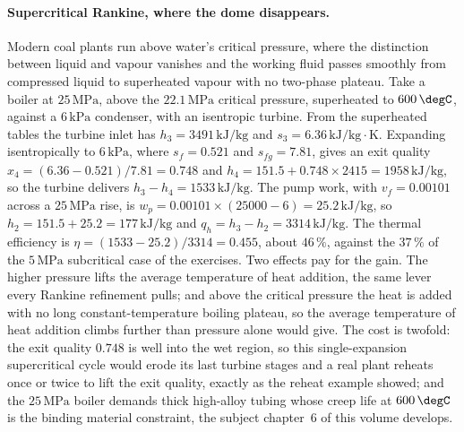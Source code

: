 \paragraph{Supercritical Rankine, where the dome disappears.} Modern coal
plants run above water's critical pressure, where the distinction between liquid
and vapour vanishes and the working fluid passes smoothly from compressed
liquid to superheated vapour with no two-phase plateau. Take a boiler at
$25\,\text{MPa}$, above the $22.1\,\text{MPa}$ critical pressure, superheated to
$600\,\degC$, against a $6\,\text{kPa}$ condenser, with an isentropic turbine.
From the superheated tables the turbine inlet has $h_3 = 3491\,\text{kJ}/\text{kg}$
and $s_3 = 6.36\,\text{kJ}/\text{kg}\cdot\text{K}$. Expanding isentropically to
$6\,\text{kPa}$, where $s_f = 0.521$ and $s_{fg} = 7.81$, gives an exit quality
$x_4 = (6.36 - 0.521)/7.81 = 0.748$ and $h_4 = 151.5 + 0.748 \times 2415 =
1958\,\text{kJ}/\text{kg}$, so the turbine delivers $h_3 - h_4 = 1533\,\text{kJ}/
\text{kg}$. The pump work, with $v_f = 0.00101$ across a $25\,\text{MPa}$ rise,
is $w_p = 0.00101 \times (25000 - 6) = 25.2\,\text{kJ}/\text{kg}$, so $h_2 =
151.5 + 25.2 = 177\,\text{kJ}/\text{kg}$ and $q_h = h_3 - h_2 = 3314\,\text{kJ}/
\text{kg}$. The thermal efficiency is $\eta = (1533 - 25.2)/3314 = 0.455$, about
$46\,\%$, against the $37\,\%$ of the $5\,\text{MPa}$ subcritical case of the
exercises. Two effects pay for the gain. The higher pressure lifts the average
temperature of heat addition, the same lever every Rankine refinement pulls; and
above the critical pressure the heat is added with no long constant-temperature
boiling plateau, so the average temperature of heat addition climbs further than
pressure alone would give. The cost is twofold: the exit quality $0.748$ is well
into the wet region, so this single-expansion supercritical cycle would erode its
last turbine stages and a real plant reheats once or twice to lift the exit
quality, exactly as the reheat example showed; and the $25\,\text{MPa}$ boiler
demands thick high-alloy tubing whose creep life at $600\,\degC$ is the binding
material constraint, the subject chapter~6 of this volume develops.

